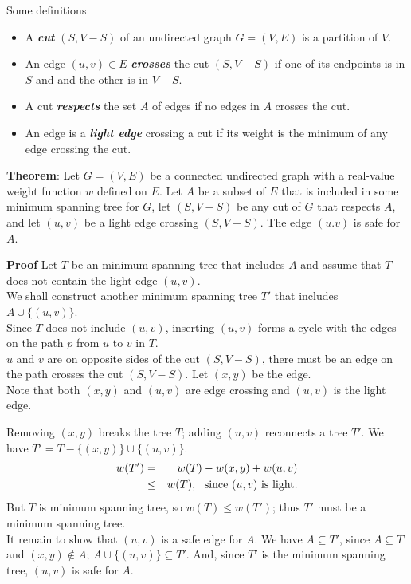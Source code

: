 \documentclass{beamer}
\begin{document}
\begin{frame}{}

\centerline{\large Some definitions}
\begin{itemize}
\item A {\it \bf cut} $(S,V-S)$ of an undirected graph $G=(V,E)$ is a 
 partition of $V$.  
\item An edge $(u,v)\in E$ {\it\bf crosses} the cut $(S,V-S)$ if one of its
 endpoints is in $S$ and and the other is in $V-S$.  
\item A cut {\it \bf respects} the set $A$ of edges if no edges in $A$ crosses
 the cut.  
\item An edge is a {\it \bf light edge} crossing a cut if its weight is the
 minimum of any edge crossing the cut.  
\end{itemize}
\end{frame}

\begin{frame}{}

{\bf Theorem}: Let $G=(V,E)$ be a connected undirected graph with a 
real-value weight function $w$ defined on $E$.  Let $A$ be a subset of $E$
 that is included in some minimum spanning tree for $G$, let $(S,V-S)$ be any
 cut of $G$ that respects $A$, and let $(u,v)$ be a light edge crossing
 $(S,V-S)$.  The edge $(u.v)$ is safe for $A$.  
\end{frame}

\begin{frame}{}

{\bf Proof} Let $T$ be an minimum spanning tree that includes $A$ and assume
 that $T$ does not contain the light edge $(u,v)$.  \\
We shall construct another minimum spanning tree $T'$ that includes
 $A\cup \{(u,v)\}$. \\
Since $T$ does not include $(u,v)$, inserting $(u,v)$ forms a cycle with
 the edges on the path $p$ from $u$ to $v$ in $T$. \\
$u$ and $v$ are on opposite sides of the cut $(S,V-S)$, there must be an edge on
 the path crosses the cut $(S,V-S)$.  Let $(x,y)$ be the edge. \\
Note that both $(x,y)$ and $(u,v)$ are edge crossing and $(u,v)$ is the light edge. 
\end{frame}

\begin{frame}{}

Removing $(x,y)$ breaks the tree $T$; adding $(u,v)$ reconnects a tree $T'$.  
 We have $T'=T-\{(x,y)\}\cup \{(u,v)\}$.  \\
\begin{eqnarray*}
w(T') &=& w(T) - w(x,y) + w(u,v) \\
  &\le & w(T), {\rm \ \ since\ } (u,v) {\rm\ is\ light}.  
\end{eqnarray*}
But $T$ is minimum spanning tree, so $w(T)\le w(T')$; thus $T'$ must
 be a minimum spanning tree.  \\
It remain to show that $(u,v)$ is a safe edge for $A$.  We have 
 $A\subseteq T'$, since $A\subseteq T$ and $(x,y)\notin A$;
 $A\cup \{(u,v)\}\subseteq T'$.  And, since $T'$ is the minimum
 spanning tree, $(u,v)$ is safe for $A$.  
\end{frame}
\end{document}
